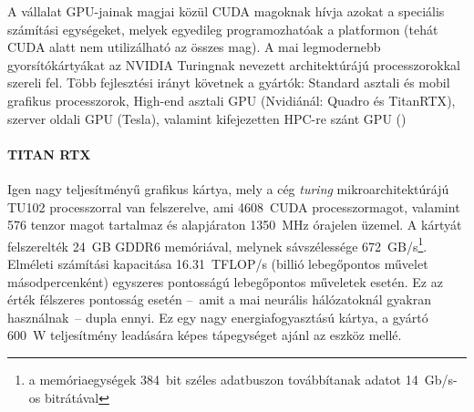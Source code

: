 A vállalat GPU-jainak magjai közül CUDA magoknak hívja azokat a speciális számítási egységeket, melyek egyedileg programozhatóak a platformon (tehát CUDA alatt nem utilizálható az összes mag). A mai legmodernebb gyorsítókártyákat az NVIDIA Turingnak nevezett architektúrájú processzorokkal szereli fel.
Több fejlesztési irányt követnek a gyártók: Standard asztali és mobil grafikus processzorok, High-end asztali GPU (Nvidiánál: Quadro és TitanRTX\cite{spec:titan-rtx}), szerver oldali GPU (Tesla\cite{spec:tesla-t4}), valamint kifejezetten HPC-re szánt GPU () 
\paragraph{TITAN RTX}
Igen nagy teljesítményű grafikus kártya, mely a cég \emph{turing} mikroarchitektúrájú TU102 processzorral van felszerelve, ami 4608~CUDA processzormagot, valamint 576 tenzor magot tartalmaz és alapjáraton 1350~MHz órajelen üzemel. A kártyát felszerelték 24~GB GDDR6 memóriával, melynek sávszélessége 672~GB/s\footnote{a memóriaegységek 384~bit széles adatbuszon továbbítanak adatot 14~Gb/s-os bitrátával}. Elméleti számítási kapacitása 16.31~TFLOP/s (billió lebegőpontos művelet másodpercenként) egyszeres pontosságú lebegőpontos műveletek esetén. Ez az érték félszeres pontosság esetén --~amit a mai neurális hálózatoknál gyakran használnak~-- dupla ennyi. Ez egy nagy energiafogyasztású kártya, a gyártó 600~W teljesítmény leadására képes tápegységet ajánl az eszköz mellé.

